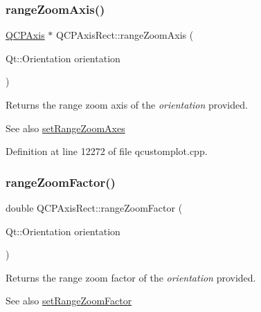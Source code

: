 \mbox{\label{class_q_c_p_axis_rect_a679c63f2b8daccfe6ec5110dce3dd3b6}} 
\subsubsection{\texorpdfstring{range\+Zoom\+Axis()}{rangeZoomAxis()}}
{\footnotesize\ttfamily \hyperlink{class_q_c_p_axis}{Q\+C\+P\+Axis} $\ast$ Q\+C\+P\+Axis\+Rect\+::range\+Zoom\+Axis (\begin{DoxyParamCaption}\item[{Qt\+::\+Orientation}]{orientation }\end{DoxyParamCaption})}

Returns the range zoom axis of the {\itshape orientation} provided.

\begin{DoxySeeAlso}{See also}
\hyperlink{class_q_c_p_axis_rect_a9442cca2aa358405f39a64d51eca13d2}{set\+Range\+Zoom\+Axes} 
\end{DoxySeeAlso}


Definition at line 12272 of file qcustomplot.\+cpp.

\mbox{\label{class_q_c_p_axis_rect_ae4e6c4d143aacc88d2d3c56f117c2fe1}} 
\subsubsection{\texorpdfstring{range\+Zoom\+Factor()}{rangeZoomFactor()}}
{\footnotesize\ttfamily double Q\+C\+P\+Axis\+Rect\+::range\+Zoom\+Factor (\begin{DoxyParamCaption}\item[{Qt\+::\+Orientation}]{orientation }\end{DoxyParamCaption})}

Returns the range zoom factor of the {\itshape orientation} provided.

\begin{DoxySeeAlso}{See also}
\hyperlink{class_q_c_p_axis_rect_a895d7ac745ea614e04056244b3c138ac}{set\+Range\+Zoom\+Factor} 
\end{DoxySeeAlso}


